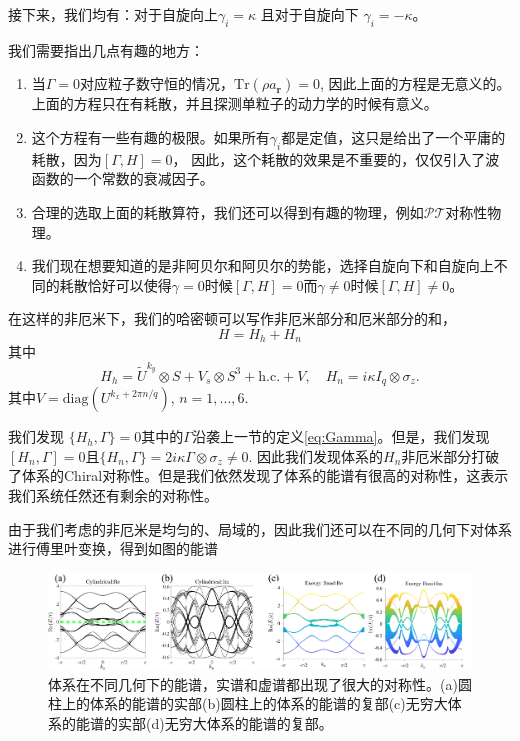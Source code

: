 \documentclass[supercite]{HustGraduPaper}
\def\r{\mathbf{r}}
\begin{document}
   接下来，我们均有：对于自旋向上$\gamma _i = \kappa$ 且对于自旋向下 $\gamma_i = -\kappa$。
   
   我们需要指出几点有趣的地方：
   \begin{enumerate}
   	\item 当$\Gamma = 0$对应粒子数守恒的情况，$\text{Tr}(\rho a_\r) =0$, 因此上面的方程是无意义的。上面的方程只在有耗散，并且探测单粒子的动力学的时候有意义。
   \item 这个方程有一些有趣的极限。如果所有$\gamma_i$都是定值，这只是给出了一个平庸的耗散，因为$[\Gamma,H] = 0$， 因此，这个耗散的效果是不重要的，仅仅引入了波函数的一个常数的衰减因子\cite{harari2018topological}。
   \item 合理的选取上面的耗散算符，我们还可以得到有趣的物理\cite{gardiner2004quantum}，例如$\mathcal{PT}$对称性物理\cite{Quijandria2018}。
   \item 我们现在想要知道的是非阿贝尔和阿贝尔的势能，选择自旋向下和自旋向上不同的耗散恰好可以使得$\gamma = 0$时候$[\Gamma,H] = 0$而$\gamma \ne 0$时候$[\Gamma,H] \ne 0$。
   \end{enumerate}
   
   在这样的非厄米下，我们的哈密顿可以写作非厄米部分和厄米部分的和，
   \begin{equation}
   H = H_h + H_n
   \end{equation}
   其中
   \begin{equation}
   H_h = \tilde{U}^{k_y} \otimes S +  V_s \otimes S^3 + \text{h.c.}+V , \quad H_n =  i \kappa I_{q} \otimes \sigma_z.  
   \end{equation}
   其中$V = \text{diag}(U^{k_x + 2\pi n/q})$, $n = 1,...,6$. 
   
   我们发现 $\{H_h, \Gamma\} = 0$其中的$\Gamma$沿袭上一节的定义\ref{eq:Gamma}。但是，我们发现$[H_n, \Gamma] = 0$且$\{H_n, \Gamma\} = 2i\kappa \Gamma \otimes \sigma_z \ne 0$. 
   	因此我们发现体系的$H_n$非厄米部分打破了体系的Chiral对称性。但是我们依然发现了体系的能谱有很高的对称性，这表示我们系统任然还有剩余的对称性。

   	
   	由于我们考虑的非厄米是均匀的、局域的，因此我们还可以在不同的几何下对体系进行傅里叶变换，得到如图的能谱
   	\begin{figure}
   		\centering
   		\includegraphics[width=1\linewidth]{Figures/topoinsu/SP3_1}
   		\caption{体系在不同几何下的能谱，实谱和虚谱都出现了很大的对称性。(a)圆柱上的体系的能谱的实部(b)圆柱上的体系的能谱的复部(c)无穷大体系的能谱的实部(d)无穷大体系的能谱的复部。}
   		\label{fig:sp31}
   	\end{figure}
   	
\end{document}
